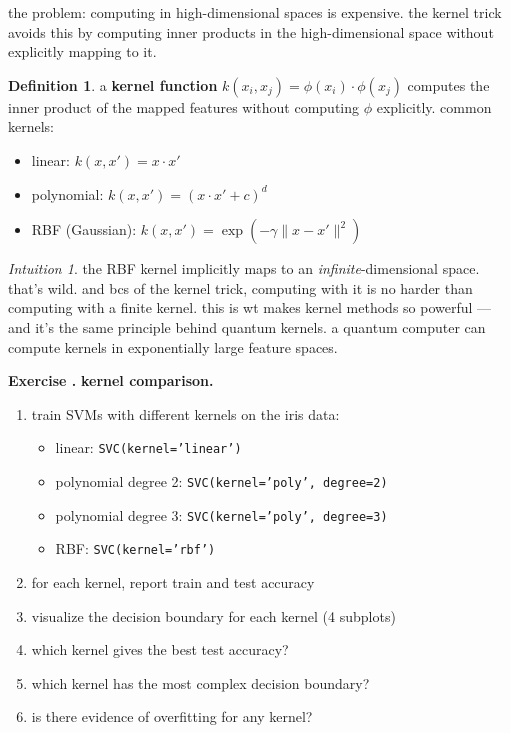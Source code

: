 \documentclass[11pt,a4paper]{article}
\theoremstyle{definition}
\newtheorem{definition}{Definition}[section]
\theoremstyle{remark}
\newtheorem*{intuition}{Intuition}
\newcounter{exercise}[section]
\newenvironment{exercise}{\refstepcounter{exercise}\par\medskip\noindent\textbf{Exercise \theexercise.}\rmfamily}{\medskip}
\begin{document}
the problem: computing in high-dimensional spaces is expensive. the kernel trick avoids this by computing inner products in the high-dimensional space without explicitly mapping to it.

\begin{definition}
a \textbf{kernel function} $k(x_i, x_j) = \phi(x_i) \cdot \phi(x_j)$ computes the inner product of the mapped features without computing $\phi$ explicitly. common kernels:
\begin{itemize}[leftmargin=*]
  \item linear: $k(x, x') = x \cdot x'$
  \item polynomial: $k(x, x') = (x \cdot x' + c)^d$
  \item RBF (Gaussian): $k(x, x') = \exp(-\gamma\|x - x'\|^2)$
\end{itemize}
\end{definition}

\begin{intuition}
the RBF kernel implicitly maps to an \textit{infinite}-dimensional space. that's wild. and bcs of the kernel trick, computing with it is no harder than computing with a finite kernel. this is wt makes kernel methods so powerful --- and it's the same principle behind quantum kernels. a quantum computer can compute kernels in exponentially large feature spaces.
\end{intuition}

\begin{exercise}
\textbf{kernel comparison.}
\begin{enumerate}[leftmargin=*]
  \item train SVMs with different kernels on the iris data:
    \begin{itemize}
      \item linear: \texttt{SVC(kernel='linear')}
      \item polynomial degree 2: \texttt{SVC(kernel='poly', degree=2)}
      \item polynomial degree 3: \texttt{SVC(kernel='poly', degree=3)}
      \item RBF: \texttt{SVC(kernel='rbf')}
    \end{itemize}
  \item for each kernel, report train and test accuracy
  \item visualize the decision boundary for each kernel (4 subplots)
  \item which kernel gives the best test accuracy?
  \item which kernel has the most complex decision boundary?
  \item is there evidence of overfitting for any kernel?
\end{enumerate}
\end{exercise}
\end{document}
